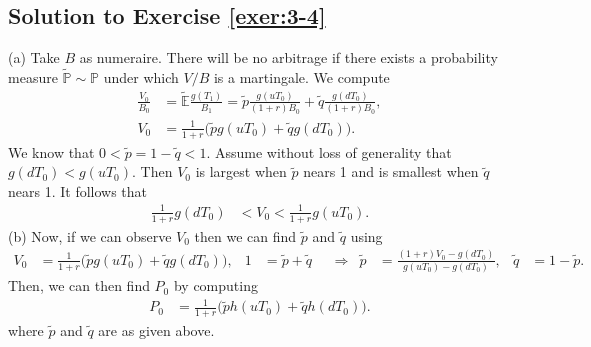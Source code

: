 \documentclass[12pt]{book}
\numberwithin{equation}{chapter}
\theoremstyle{plain}
\numberwithin{theorem}{section}
\theoremstyle{definition}
\numberwithin{exercise}{chapter}
\newcommand{\<}{\langle}
\renewcommand{\>}{\rangle}
\renewcommand{\(}{\left(}
\renewcommand{\)}{\right)}
\renewcommand{\[}{\left[}
\renewcommand{\]}{\right]}
\newcommand\Eb{\mathds{E}}
\newcommand\Pb{\mathds{P}}
\newcommand\Ebt{\widetilde{\Eb}}
\newcommand\Pbt{\widetilde{\Pb}}
\newcommand\qt{\widetilde{q}}
\theoremstyle{definition}
\numberwithin{question}{section}
\newcommand\pt{\widetilde{p}}
\begin{document}
\subsection*{Solution to Exercise \ref{exer:3-4}}
(a) 
Take $B$ as numeraire.  There will be no arbitrage if there exists a probability measure $\Pbt \sim \Pb$ under which $V/B$ is a martingale.  We compute
\begin{align}
\frac{V_0}{B_0}
	&=	\Ebt \frac{g(T_1)}{B_1}
	=		\pt \frac{g(u T_0)}{(1+r)B_0} + \qt \frac{g(d T_0)}{(1+r)B_0} , \\
V_0
	&=	\frac{1}{1+r}\Big(\pt g(u T_0) + \qt g(d T_0) \Big) .
\end{align}
We know that $0 < \pt= 1 - \qt < 1$.  Assume without loss of generality that $g(d T_0) < g( u T_0 )$.  Then $V_0$ is largest when $\pt$ nears 1 and is smallest when $\qt$ nears 1.  It follows that
\begin{align}
\frac{1}{1+r} g(d T_0 )
	&< V_0 < \frac{1}{1+r} g(u T_0 ) .
\end{align}
(b) Now, if we can observe $V_0$ then we can find $\pt$ and $\qt$ using
\begin{align}
V_0
	&=	\frac{1}{1+r}\Big(\pt g(u T_0) + \qt g(d T_0) \Big) , &
1
	&=	\pt + \qt &
	&\Rightarrow&
\pt
	&=	\frac{(1+r) V_0 - g(d T_0)}{g (u T_0) - g(d T_0)} , &
\qt
	&= 1 - \pt .  
\end{align}
Then, we can then find $P_0$ by computing
\begin{align}
P_0
	&=	\frac{1}{1+r}\Big(\pt h(u T_0) + \qt h(d T_0) \Big) .
\end{align}
where $\pt$ and $\qt$ are as given above.

\end{document}
